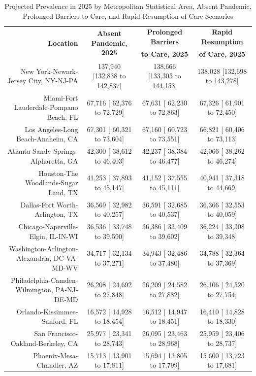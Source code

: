 \documentclass{article}
\begin{document}
\begin{table}[H]
	\caption{Projected Prevalence in 2025 by Metropolitan Statistical Area, Absent Pandemic, Prolonged Barriers to Care, and Rapid Resumption of Care Scenarios}
	\footnotesize
	\begin{tabular}{|r|c|c|c|}
		\hline
		\multirow{2}{*}{\textbf{Location}} & \multirow{2}{*}{\textbf{Absent Pandemic, 2025}} & \textbf{Prolonged Barriers} & \textbf{Rapid Resumption}\\
		&  & \textbf{to Care, 2025} & \textbf{of Care, 2025}\\
		\hline\hline
		New York-Newark-Jersey City, NY-NJ-PA & 137,940 [132,838 to 142,837] & 138,666 [133,305 to 144,153] & 138,028 [132,698 to 143,278]\\
		Miami-Fort Lauderdale-Pompano Beach, FL &  67,716 [ 62,376 to  72,729] &  67,631 [ 62,230 to  72,863] &  67,326 [ 61,901 to  72,450]\\
		Los Angeles-Long Beach-Anaheim, CA &  67,301 [ 60,321 to  73,604] &  67,160 [ 60,723 to  73,551] &  66,821 [ 60,406 to  73,113]\\
		Atlanta-Sandy Springs-Alpharetta, GA &  42,300 [ 38,612 to  46,403] &  42,237 [ 38,384 to  46,477] &  42,066 [ 38,262 to  46,274]\\
		Houston-The Woodlands-Sugar Land, TX &  41,253 [ 37,893 to  45,147] &  41,152 [ 37,555 to  45,111] &  40,941 [ 37,318 to  44,669]\\
		Dallas-Fort Worth-Arlington, TX &  36,569 [ 32,982 to  40,257] &  36,591 [ 32,685 to  40,537] &  36,366 [ 32,553 to  40,059]\\
		Chicago-Naperville-Elgin, IL-IN-WI &  36,536 [ 33,748 to  39,590] &  36,386 [ 33,409 to  39,602] &  36,224 [ 33,308 to  39,348]\\
		Washington-Arlington-Alexandria, DC-VA-MD-WV &  34,717 [ 32,134 to  37,271] &  34,943 [ 32,486 to  37,480] &  34,788 [ 32,364 to  37,369]\\
		Philadelphia-Camden-Wilmington, PA-NJ-DE-MD &  26,208 [ 24,692 to  27,848] &  26,209 [ 24,582 to  27,882] &  26,106 [ 24,520 to  27,754]\\
		Orlando-Kissimmee-Sanford, FL &  16,572 [ 14,928 to  18,454] &  16,512 [ 14,947 to  18,451] &  16,410 [ 14,828 to  18,330]\\
		San Francisco-Oakland-Berkeley, CA &  25,977 [ 23,341 to  28,743] &  26,095 [ 23,463 to  28,968] &  25,959 [ 23,406 to  28,737]\\
		Phoenix-Mesa-Chandler, AZ &  15,713 [ 13,901 to  17,811] &  15,694 [ 13,805 to  17,799] &  15,600 [ 13,723 to  17,681]\\

\end{tabular}
\end{table}
\end{document}
